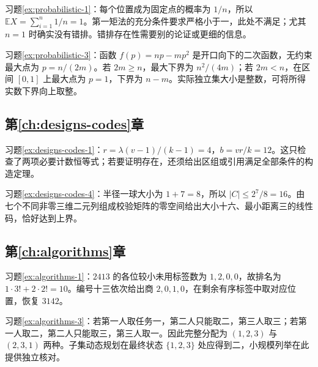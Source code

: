 习题\ref{ex:probabilistic-1}：每个位置成为固定点的概率为 $1/n$，所以 $\mathbb E X=\sum_{i=1}^n1/n=1$。第一矩法的充分条件要求严格小于一，此处不满足；尤其 $n=1$ 时确实没有错排。错排存在性需要别的论证或更细的信息。

习题\ref{ex:probabilistic-3}：函数 $f(p)=np-mp^2$ 是开口向下的二次函数，无约束最大点为 $p=n/(2m)$。若 $2m\ge n$，最大下界为 $n^2/(4m)$；若 $2m<n$，在区间 $[0,1]$ 上最大点为 $p=1$，下界为 $n-m$。实际独立集大小是整数，可将所得实数下界向上取整。

\subsection{第\ref{ch:designs-codes}章}

习题\ref{ex:designs-codes-1}：$r=\lambda(v-1)/(k-1)=4$，$b=vr/k=12$。这只检查了两项必要计数恒等式；若要证明存在，还须给出区组或引用满足全部条件的构造定理。

习题\ref{ex:designs-codes-4}：半径一球大小为 $1+7=8$，所以 $|C|\le2^7/8=16$。由七个不同非零三维二元列组成校验矩阵的零空间给出大小十六、最小距离三的线性码，恰好达到上界。

\subsection{第\ref{ch:algorithms}章}

习题\ref{ex:algorithms-1}：$2413$ 的各位较小未用标签数为 $1,2,0,0$，故排名为 $1\cdot3!+2\cdot2!=10$。编号十三依次给出商 $2,0,1,0$，在剩余有序标签中取对应位置，恢复 $3142$。

习题\ref{ex:algorithms-3}：若第一人取任务一，第二人只能取二，第三人取三；若第一人取二，第二人只能取三，第三人取一。因此完整分配为 $(1,2,3)$ 与 $(2,3,1)$ 两种。子集动态规划在最终状态 $\{1,2,3\}$ 处应得到二，小规模列举在此提供独立核对。

